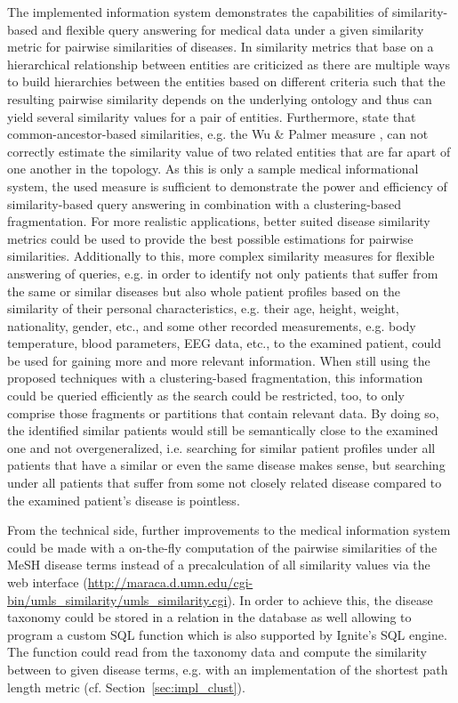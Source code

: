 The implemented information system demonstrates the capabilities of similarity-based and flexible query answering for medical data under a given similarity metric
for pairwise similarities of diseases. In \cite{Mathur2012} similarity metrics that base on a hierarchical relationship between entities are criticized as there
are multiple ways to build hierarchies between the entities based on different criteria such that the resulting pairwise similarity depends on the underlying
ontology and thus can yield several similarity values for a pair of entities. Furthermore, \cite{Mathur2012} state that common-ancestor-based similarities, e.g.
the Wu \& Palmer measure \citep{Wu1994}, can not correctly estimate the similarity value of two related entities that are far apart of one another in the topology.
As this is only a sample medical informational system, the used  measure \citep{McInnes2009} is sufficient to demonstrate the power and 
efficiency of similarity-based query answering in combination with a clustering-based fragmentation. For more realistic applications, better suited disease 
similarity metrics could be used to provide the best possible estimations for pairwise similarities. Additionally to this, more complex similarity measures for
flexible answering of queries, e.g. in order to identify not only patients that suffer from the same or similar diseases but also whole patient profiles based on
the similarity of their personal characteristics, e.g. their age, height, weight, nationality, gender, etc., and some other recorded measurements, e.g. body
temperature, blood parameters, EEG data, etc., to the examined patient, could be used for gaining more and more relevant information. When still using the proposed
techniques with a clustering-based fragmentation, this information could be queried efficiently as the search could be restricted, too, to only comprise those
fragments or partitions that contain relevant data. By doing so, the identified similar patients would still be semantically close to the examined one and not
overgeneralized, i.e. searching for similar patient profiles under all patients that have a similar or even the same disease makes sense, but searching under all
patients that suffer from some not closely related disease compared to the examined patient's disease is pointless.


From the technical side, further improvements to the medical information system could be made with a on-the-fly computation of the pairwise similarities of the MeSH
disease terms instead of a precalculation of all similarity values via the  web interface 
(\url{http://maraca.d.umn.edu/cgi-bin/umls_similarity/umls_similarity.cgi}). In order to achieve this, the disease taxonomy could be stored in a relation in the
database as well allowing to program a custom SQL function which is also supported by Ignite's SQL engine. The function could read from the taxonomy data and 
compute the similarity between to given disease terms, e.g. with an implementation of the shortest path length metric (cf. Section~\ref{sec:impl_clust}).


